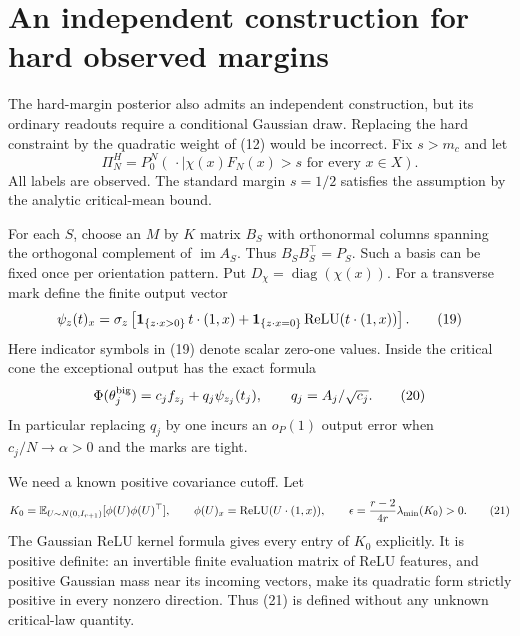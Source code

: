 \section{An independent construction for hard observed margins}
The hard-margin posterior also admits an independent construction, but
its ordinary readouts require a conditional Gaussian draw. Replacing the
hard constraint by the quadratic weight of (12) would be incorrect.
Fix $s>m_c$ and let
\[
 \Pi_N^H=P_0^N(\,\cdot\mid \chi(x)F_N(x)>s\text{ for every }x\in X).
 \tag{18}
\]
All labels are observed. The standard margin $s=1/2$ satisfies the
assumption by the analytic critical-mean bound.

For each $S$, choose an $M$ by $K$ matrix $B_S$ with orthonormal
columns spanning the orthogonal complement of $\operatorname{im}A_S$.
Thus $B_SB_S^\top=P_S$. Such a basis can be fixed once per orientation
pattern. Put $D_\chi=\operatorname{diag}(\chi(x))$.
For a transverse mark define the finite output vector
\[
 \psi_z(t)_x=\sigma_z\left[
   \boldsymbol1_{\{z\cdot x>0\}}\,t\cdot(1,x)
       +\boldsymbol1_{\{z\cdot x=0\}}\operatorname{ReLU}(t\cdot(1,x))\right]. \tag{19}
\]
Here indicator symbols in (19) denote scalar zero-one values. Inside the
critical cone the exceptional output has the exact formula
\[
              \Phi(\theta_j^{\rm big})=c_j f_{z_j}
                           +q_j\psi_{z_j}(t_j),\qquad
                       q_j=A_j/\sqrt{c_j}.              \tag{20}
\]
In particular replacing $q_j$ by one incurs an $o_P(1)$ output error
when $c_j/N\to\alpha>0$ and the marks are tight.

We need a known positive covariance cutoff. Let
\[
 K_0=\mathbb E_{U\sim N(0,I_{r+1})}
       [\phi(U)\phi(U)^\top],\qquad
 \phi(U)_x=\operatorname{ReLU}(U\cdot(1,x)),
 \qquad \epsilon=\frac{r-2}{4r}\lambda_{\min}(K_0)>0.
 \tag{21}
\]
The Gaussian ReLU kernel formula gives every entry of $K_0$ explicitly.
It is positive definite: an invertible finite evaluation matrix of
ReLU features, and positive Gaussian mass near its incoming vectors,
make its quadratic form strictly positive in every nonzero direction.
Thus (21) is defined without any unknown critical-law quantity.

